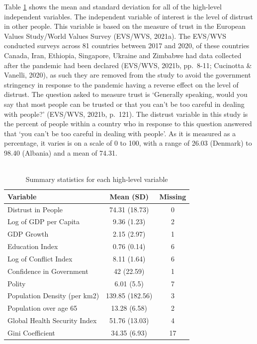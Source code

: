 \documentclass[
  11pt,
]{article}
\begin{document}
Table \ref{tab:stats} shows the mean and standard deviation for all of the high-level independent variables. The independent variable of interest is the level of distrust in other people. This variable is based on the measure of trust in the European Values Study/World Values Survey (EVS/WVS, 2021a). The EVS/WVS conducted surveys across 81 countries between 2017 and 2020, of these countries Canada, Iran, Ethiopia, Singapore, Ukraine and Zimbabwe had data collected after the pandemic had been declared (EVS/WVS, 2021b, pp.~8-11; Cucinotta \& Vanelli, 2020), as such they are removed from the study to avoid the government stringency in response to the pandemic having a reverse effect on the level of distrust. The question asked to measure trust is `Generally speaking, would you say that most people can be trusted or that you can't be too careful in dealing with people?' (EVS/WVS, 2021b, p.~121). The distrust variable in this study is the percent of people within a country who in response to this question answered that `you can't be too careful in dealing with people'. As it is measured as a percentage, it varies is on a scale of 0 to 100, with a range of 26.03 (Denmark) to 98.40 (Albania) and a mean of 74.31.\\
~\\

\begin{table}

\caption{\label{tab:stats}Summary statistics for each high-level variable}
\centering
\begin{tabular}[t]{lcc}
\toprule
Variable & Mean (SD) & Missing\\
\midrule
Distrust in People & 74.31 (18.73) & 0\\
Log of GDP per Capita & 9.36 (1.23) & 2\\
GDP Growth & 2.15 (2.97) & 1\\
Education Index & 0.76 (0.14) & 6\\
Log of Conflict Index & 8.11 (1.64) & 6\\
\addlinespace
Confidence in Government & 42 (22.59) & 1\\
Polity & 6.01 (5.5) & 7\\
Population Density (per km2) & 139.85 (182.56) & 3\\
Population over age 65 & 13.28 (6.58) & 2\\
Global Health Security Index & 51.76 (13.03) & 4\\
\addlinespace
Gini Coefficient & 34.35 (6.93) & 17\\
\bottomrule
\end{tabular}
\end{table}
\end{document}
